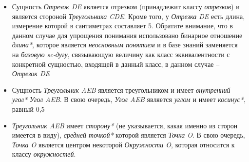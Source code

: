 \begin{SCn}
\begin{scnstruct}
\begin{scnsubstruct}
\begin{scnitemize}
{{\begin{itemize}
                \item{Сущность \textit{Отрезок DE} является отрезком (принадлежит классу \textit{отрезков}) и является стороной \textit{Треугольника CDE}. Кроме того, у \textit{Отрезка DE} есть длина, измерение которой в сантиметрах составляет 5. Обратите внимание, что в данном случае для упрощения понимания использовано бинарное отношение \textit{длина*}, которое является \textit{неосновным понятием} и в базе знаний заменяется на \textit{базовую sc-дугу}, связывающую величину как класс эквивалентности с конкретной сущностью, входящей в данный класс, в данном случае -- \textit{Отрезок DE}  }
                \item{Сущность \textit{Треугольник AEB} является треугольником и имеет \textit{внутренний угол*} \textit{Угол AEB}. В свою очередь, \textit{Угол AEB} является \textit{углом} и имеет \textit{косинус*}, равный 0,5}
                \item{\textit{Треугольник AEB} имеет \textit{сторону*} (не указывается, какая именно из сторон имеется в виду), \textit{средней точкой*} которой является \textit{Точка O}. В свою очередь, \textit{Точка O} является центром некоторой \textit{Окружности O}, которая относится к классу \textit{окружностей}.}
                \end{itemize}
           		}
           	}
                \item{
                \newpage{}}
            \end{scnitemize}
            \bigskip
        \end{scnsubstruct}
        \scnendsegmentcomment
        

\end{scnstruct}
\end{SCn}
